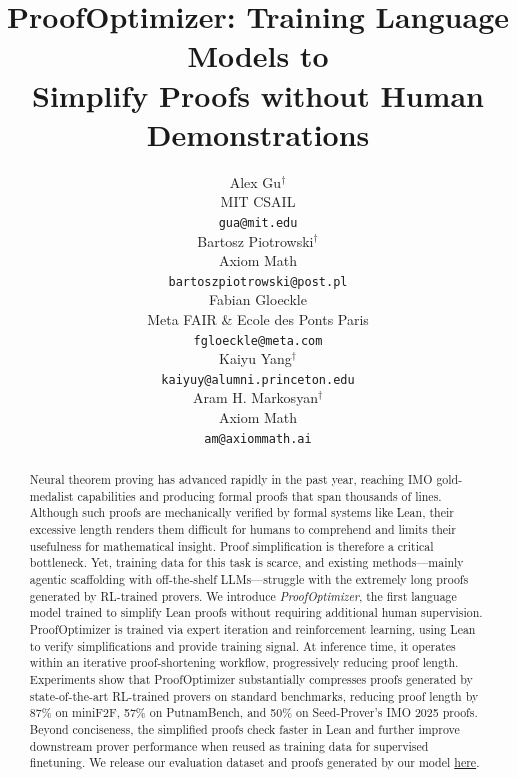 \documentclass{article} %
\title{ProofOptimizer: Training Language Models to \\Simplify Proofs without Human Demonstrations}
\author{Alex Gu$^\dagger$ \\
MIT CSAIL \\
\texttt{gua@mit.edu} \\
\And
Bartosz Piotrowski$^\dagger$ \\
Axiom Math \\
\texttt{bartoszpiotrowski@post.pl} \\
\And
Fabian Gloeckle \\
Meta FAIR \& Ecole des Ponts Paris \\
\texttt{fgloeckle@meta.com} \\
\And
Kaiyu Yang$^\dagger$ \\
\texttt{kaiyuy@alumni.princeton.edu} \\
\And
Aram H. Markosyan$^\dagger$ \\
Axiom Math \\
\texttt{am@axiommath.ai}
}
\begin{document}
\maketitle

\begingroup
\renewcommand\thefootnote{\fnsymbol{footnote}}
\endgroup

\begin{abstract}
Neural theorem proving has advanced rapidly in the past year, reaching IMO gold-medalist capabilities and producing formal proofs that span thousands of lines. Although such proofs are mechanically verified by formal systems like Lean, their excessive length renders them difficult for humans to comprehend and limits their usefulness for mathematical insight. Proof simplification is therefore a critical bottleneck. Yet, training data for this task is scarce, and existing methods---mainly agentic scaffolding with off-the-shelf LLMs---struggle with the extremely long proofs generated by RL-trained provers. We introduce \emph{ProofOptimizer}, the first language model trained to simplify Lean proofs without requiring additional human supervision. ProofOptimizer is trained via expert iteration and reinforcement learning, using Lean to verify simplifications and provide training signal. At inference time, it operates within an iterative proof-shortening workflow, progressively reducing proof length. Experiments show that ProofOptimizer substantially compresses proofs generated by state-of-the-art RL-trained provers on standard benchmarks, reducing proof length by 87\% on miniF2F, 57\% on PutnamBench, and 50\% on Seed-Prover's IMO 2025 proofs. Beyond conciseness, the simplified proofs check faster in Lean and further improve downstream prover performance when reused as training data for supervised finetuning. We release our evaluation dataset and proofs generated by our model \href{https://proof-optimizer.github.io/}{here}.
\end{abstract}










\newpage



\raggedbottom
\appendix


\end{document}
